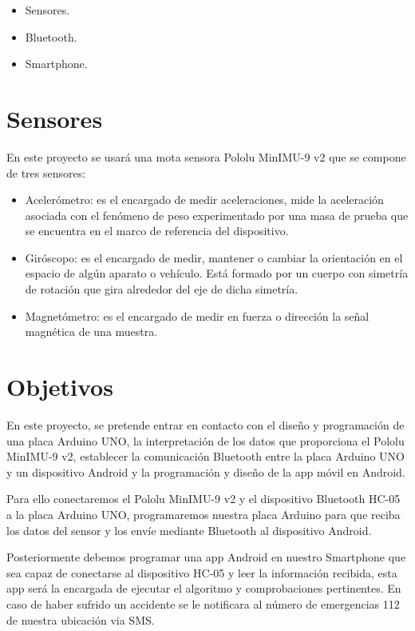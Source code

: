 		\begin{itemize}
			\item Sensores.
			\item Bluetooth.
			\item Smartphone.
		\end{itemize}
	
	\section{Sensores}
	
		En este proyecto se usar\'a una mota sensora Pololu MinIMU-9 v2 que se compone de tres sensores:
		
		\begin{itemize}
			\item Aceler\'ometro: es el encargado de medir aceleraciones, mide la aceleraci\'on asociada con el fen\'omeno de peso experimentado por una masa de prueba que se encuentra en el marco de referencia del dispositivo.
			
			\item Gir\'oscopo: es el encargado de medir, mantener o cambiar la orientaci\'on en el espacio de algún aparato o veh\'iculo. Est\'a formado por un cuerpo con simetr\'ia de rotaci\'on que gira alrededor del eje de dicha simetr\'ia.
			
			\item Magnet\'ometro: es el encargado de medir en fuerza o direcci\'on la señal magn\'etica de una muestra. 
		\end{itemize}
	
	\section{Objetivos}
	
		En este proyecto, se pretende entrar en contacto con el dise\~no y programaci\'on de una placa Arduino UNO, la interpretaci\'on de los datos que proporciona el Pololu MinIMU-9 v2, establecer la comunicaci\'on Bluetooth entre la placa Arduino UNO y un dispositivo Android y la programaci\'on y dise\~no de la app m\'ovil en Android.
	
		Para ello conectaremos el Pololu MinIMU-9 v2 y el dispositivo Bluetooth HC-05 a la placa Arduino UNO, programaremos nuestra placa Arduino para que reciba los datos del sensor y los env\'ie mediante Bluetooth al dispositivo Android.
		
		Posteriormente debemos programar una app Android en nuestro Smartphone que sea capaz de conectarse al dispositivo HC-05 y leer la informaci\'on recibida, esta app ser\'a la encargada de ejecutar el algoritmo y comprobaciones pertinentes. En caso de haber sufrido un accidente se le notificara al n\'umero de emergencias 112 de nuestra ubicaci\'on via SMS.
		
